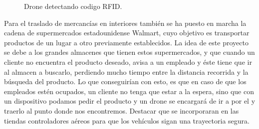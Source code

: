 \begin{figure}[H]
 \centering
 \caption{Drone detectando codigo RFID.}
 \label{f:Drone detecta codigo RFID}
\end{figure} 


\hspace{1 cm} Para el traslado de mercanc\'ias en interiores tambi\'en se ha puesto en marcha la cadena de supermercados estadounidense Walmart, cuyo objetivo es transportar productos de un lugar a otro previamente establecidos. La idea de este proyecto se debe a los grandes almacenes que tienen estos supermercados, y que cuando un cliente no encuentra el producto deseado, avisa a un empleado y \'este tiene que ir al almacen a buscarlo, perdiendo mucho tiempo entre la distancia recorrida y la b\'usqueda del producto. Lo que conseguir\'ian con esto, es que en caso de que los empleados est\'en ocupados, un cliente no tenga que estar a la espera, sino que con un dispositivo podamos pedir el producto y un drone se encargar\'a de ir a por el y traerlo al punto donde nos encontremos. Destacar que se incorporaran en las tiendas controladores a\'ereos para que los veh\'iculos sigan una trayectoria segura.  



